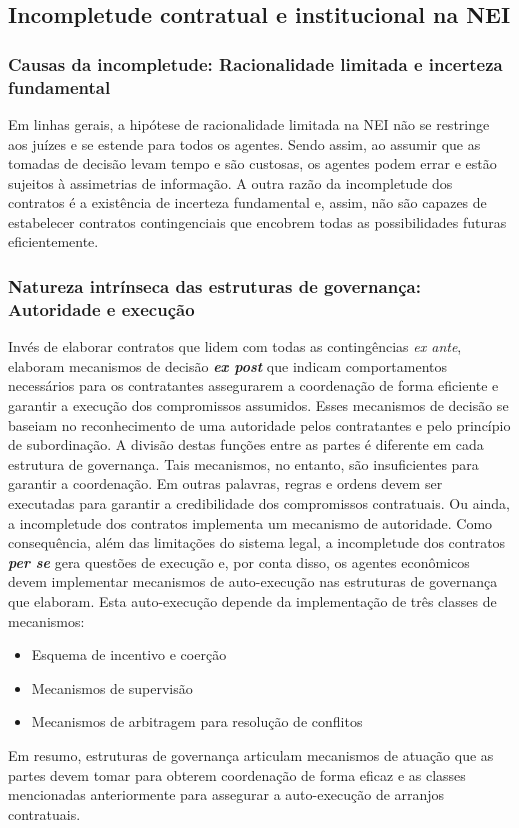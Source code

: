 \subsection*{Incompletude contratual e institucional na NEI}

\subsubsection*{Causas da incompletude: Racionalidade limitada e incerteza fundamental}

Em linhas gerais, a hipótese de racionalidade limitada na NEI não se restringe aos juízes e se estende para todos os agentes. Sendo assim, ao assumir que as tomadas de decisão levam tempo e são custosas, os agentes podem errar e estão sujeitos à assimetrias de informação. A outra razão da incompletude dos contratos é a existência de incerteza fundamental e, assim, não são capazes de estabelecer contratos contingenciais que encobrem todas as possibilidades futuras eficientemente.

\subsubsection*{Natureza intrínseca das estruturas de governança: Autoridade e execução}

Invés de elaborar contratos que lidem com todas as contingências \textit{ex ante}, elaboram mecanismos de decisão \textbf{\textit{ex post}} que indicam comportamentos necessários para os contratantes assegurarem a coordenação de forma eficiente e garantir a execução dos compromissos assumidos. Esses mecanismos de decisão se baseiam no reconhecimento de uma autoridade pelos contratantes e pelo princípio de subordinação. A divisão destas funções entre as partes é diferente em cada estrutura de governança. Tais mecanismos, no entanto, são insuficientes para garantir a coordenação. Em outras palavras, regras e ordens devem ser executadas para garantir a credibilidade dos compromissos contratuais. Ou ainda,  a incompletude dos contratos  implementa um mecanismo de autoridade. Como consequência, além das limitações do sistema legal, a incompletude dos contratos \textbf{\textit{per se}} gera questões de execução e, por conta disso, os agentes econômicos devem implementar mecanismos de auto-execução nas estruturas de governança que elaboram. Esta auto-execução depende da implementação de três classes de mecanismos:

\begin{itemize}
	\item Esquema de incentivo e coerção
	\item Mecanismos de supervisão
	\item Mecanismos de arbitragem para resolução de conflitos
\end{itemize}
Em resumo, estruturas de governança articulam mecanismos de atuação que as partes devem tomar para obterem coordenação de forma eficaz e as classes mencionadas anteriormente para assegurar a auto-execução de arranjos contratuais.

